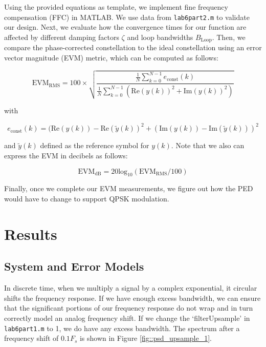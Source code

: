 \documentclass{article}
\begin{document}
Using the provided equations as template, we implement fine frequency compensation (FFC) in MATLAB. We use data from \texttt{lab6part2.m} to validate our design. Next, we evaluate how the convergence times for our function are affected by different damping factors $\zeta$ and loop bandwidths $B_\text{Loop}$. Then, we compare the phase-corrected constellation to the ideal constellation using an error vector magnitude (EVM) metric, which can be computed as follows:

\begin{equation}
	\text{EVM}_\text{RMS} = 100 \times \sqrt{\frac{\frac{1}{N}\sum_{k=0}^{N-1}{e_\text{const}(k)}}{\frac{1}{N}\sum_{k=0}^{N-1}{(\text{Re}(y(k))^2 + \text{Im}(y(k))^2)}}}
\end{equation}

\noindent with

\begin{equation}
	e_\text{const}(k) = (\text{Re}(y(k)) - \text{Re}(\tilde{y}(k))^2 + (\text{Im}(y(k)) - \text{Im}(\tilde{y}(k)))^2
\end{equation}

\noindent and $\tilde{y}(k)$ defined as the reference symbol for $y(k)$. Note that we also can express the EVM in decibels as follows:

\begin{equation}
	\text{EVM}_\text{dB} = 20\text{log}_{10}(\text{EVM}_\text{RMS}/100)
\end{equation}

\noindent Finally, once we complete our EVM measurements, we figure out how the PED would have to change to support QPSK modulation.

\section{Results}

\subsection{System and Error Models}

In discrete time, when we multiply a signal by a complex exponential, it circular shifts the frequency response. If we have enough excess bandwidth, we can ensure that the significant portions of our frequency response do not wrap and in turn correctly model an analog frequency shift. If we change the `filterUpsample' in \texttt{lab6part1.m} to 1, we do have any excess bandwidth. The spectrum after a frequency shift of $0.1F_s$ is shown in Figure \ref{fig::psd_upsample_1}.
\end{document}
